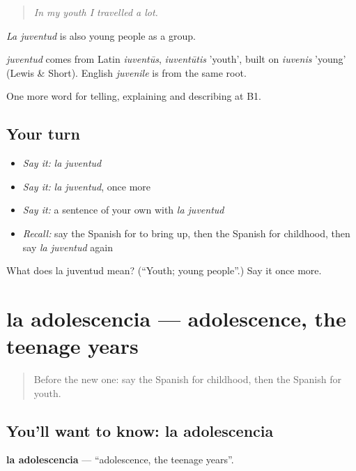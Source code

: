 \begin{quote}
\emph{In my youth I travelled a lot.}
\end{quote}

\emph{La juventud} is also young people as a group.

\begin{cousinweb}
\emph{juventud} comes from Latin \emph{iuventūs}, \emph{iuventūtis} 'youth', built on \emph{iuvenis} 'young' (Lewis \& Short). English \emph{juvenile} is from the same root.
\end{cousinweb}

\begin{grammarlens}[title={What you've built}]
One more word for telling, explaining and describing at B1.
\end{grammarlens}

\subsection*{Your turn}
\begin{itemize}
\raggedright
  \item \emph{Say it:} \emph{la juventud}
  \item \emph{Say it:} \emph{la juventud}, once more
  \item \emph{Say it:} a sentence of your own with \emph{la juventud}
  \item \emph{Recall:} say the Spanish for to bring up, then the Spanish for childhood, then say \emph{la juventud} again
\end{itemize}

\begin{tcolorbox}[breakable,colback=teal!4,colframe=teal!35!black,title={Before you move on}]
What does la juventud mean? (\textquotedblleft{}Youth; young people\textquotedblright{}.) Say it once more.
\end{tcolorbox}
\section[la adolescencia]{la adolescencia — adolescence, the teenage years}

\label{lesson:ES-C545-adolescencia}



\begin{quote}
Before the new one: say the Spanish for childhood, then the Spanish for youth.
\end{quote}

\subsection*{You'll want to know: la adolescencia}
\textbf{la adolescencia} — \textquotedblleft{}adolescence, the teenage years\textquotedblright{}.

